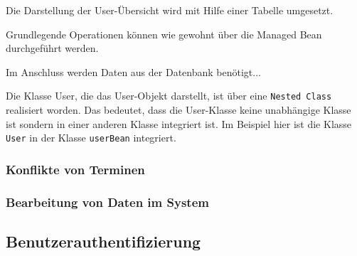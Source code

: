 Die Darstellung der User-Übersicht wird mit Hilfe einer Tabelle umgesetzt.

	

Grundlegende Operationen können wie gewohnt über die Managed Bean durchgeführt werden.

	

Im Anschluss werden Daten aus der Datenbank benötigt...
	

Die Klasse User, die das User-Objekt darstellt, ist über eine \texttt{Nested Class} realisiert worden. Das bedeutet, dass die User-Klasse keine unabhängige Klasse ist sondern in einer anderen Klasse integriert ist. Im Beispiel hier ist die Klasse \texttt{User} in  der Klasse \texttt{userBean} integriert.

	
	
\subsubsection{Konflikte von Terminen}

\subsubsection{Bearbeitung von Daten im System}

\subsection{Benutzerauthentifizierung}

